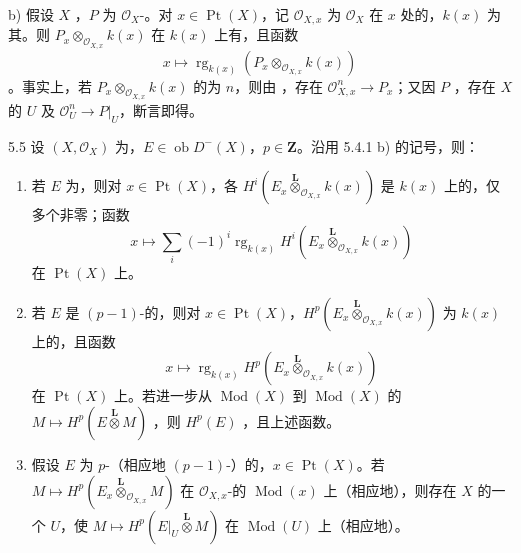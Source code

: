 b) 假设 $X$ ，$P$ 为 $\mathcal O_X$-。对 $x\in\operatorname{Pt}(X)$，记 $\mathcal O_{X,x}$ 为 $\mathcal O_X$ 在 $x$ 处的，$k(x)$ 为其。则 $P_x\otimes_{\mathcal O_{X,x}}k(x)$ 在 $k(x)$ 上有，且函数
\[
x\longmapsto\operatorname{rg}_{k(x)}(P_x\otimes_{\mathcal O_{X,x}}k(x))
\]
。事实上，若 $P_x\otimes_{\mathcal O_{X,x}}k(x)$ 的为 $n$，则由 ，存在 $\mathcal O_{X,x}^n\to P_x$；又因 $P$ ，存在 $X$ 的 $U$ 及 $\mathcal O_U^n\to P|_U$，断言即得。

\begin{SGAresult}{}{5.5}
设 $(X,\mathcal O_X)$ 为，$E\in\operatorname{ob}D^-(X)$，$p\in\mathbf Z$。沿用 5.4.1 b) 的记号，则：
\begin{enumerate}
\item[(i)] 若 $E$ 为，则对 $x\in\operatorname{Pt}(X)$，各 $H^i(E_x\mathbin{\overset{\mathbf L}{\otimes}}_{\mathcal O_{X,x}}k(x))$ 是 $k(x)$ 上的，仅多个非零；函数
\[
x\longmapsto\sum_i(-1)^i\operatorname{rg}_{k(x)}H^i(E_x\mathbin{\overset{\mathbf L}{\otimes}}_{\mathcal O_{X,x}}k(x))
\]
在 $\operatorname{Pt}(X)$ 上。
\item[(ii)] 若 $E$ 是 $(p-1)$-的，则对 $x\in\operatorname{Pt}(X)$，$H^p(E_x\mathbin{\overset{\mathbf L}{\otimes}}_{\mathcal O_{X,x}}k(x))$ 为 $k(x)$ 上的，且函数
\[
x\longmapsto\operatorname{rg}_{k(x)}H^p(E_x\mathbin{\overset{\mathbf L}{\otimes}}_{\mathcal O_{X,x}}k(x))
\]
在 $\operatorname{Pt}(X)$ 上。若进一步从 $\operatorname{Mod}(X)$ 到 $\operatorname{Mod}(X)$ 的 $M\mapsto H^p(E\mathbin{\overset{\mathbf L}{\otimes}}M)$ ，则 $H^p(E)$ ，且上述函数。
\item[(iii)] 假设 $E$ 为 $p$-（相应地 $(p-1)$-）的，$x\in\operatorname{Pt}(X)$。若 $M\mapsto H^p(E_x\mathbin{\overset{\mathbf L}{\otimes}}_{\mathcal O_{X,x}}M)$ 在 $\mathcal O_{X,x}$-的 $\operatorname{Mod}(x)$ 上（相应地），则存在 $X$ 的一个 $U$，使 $M\mapsto H^p(E|_U\mathbin{\overset{\mathbf L}{\otimes}}M)$ 在 $\operatorname{Mod}(U)$ 上（相应地）。
\end{enumerate}
\end{SGAresult}
